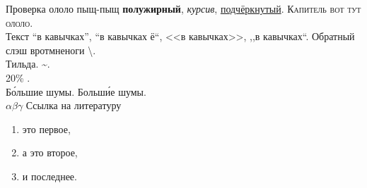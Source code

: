 \documentclass[a4paper,12pt]{report} %
\begin{document}
    \begin{center}
        \begin{minipage}{1\textwidth}
            Проверка ололо пыщ-пыщ \textbf{полужирный}, \textit{курсив}, \underline{подчёркнутый}. \textsc{Капитель вот тут ололо}. \\
            Текст ``в кавычках'', ``в кавычках ё``, <<в кавычках>>, ,,в кавычках``.
            Обратный слэш вротмненоги \textbackslash. \\
            Тильда. \textasciitilde. \\
            20\% .\\
            Б\'{о}льшие шумы. Больш\'{и}е шумы.\\
            $ \alpha \beta \gamma $
            Ссылка на литературу \cite{catheydowskinewparadigm}
        \end{minipage}
    \end{center}
    
    \begin{enumerate}
        \item это первое,
        \item а это второе,
        \item и последнее.
    \end{enumerate}
    
%    
%    
%    
%    

    
\end{document}
